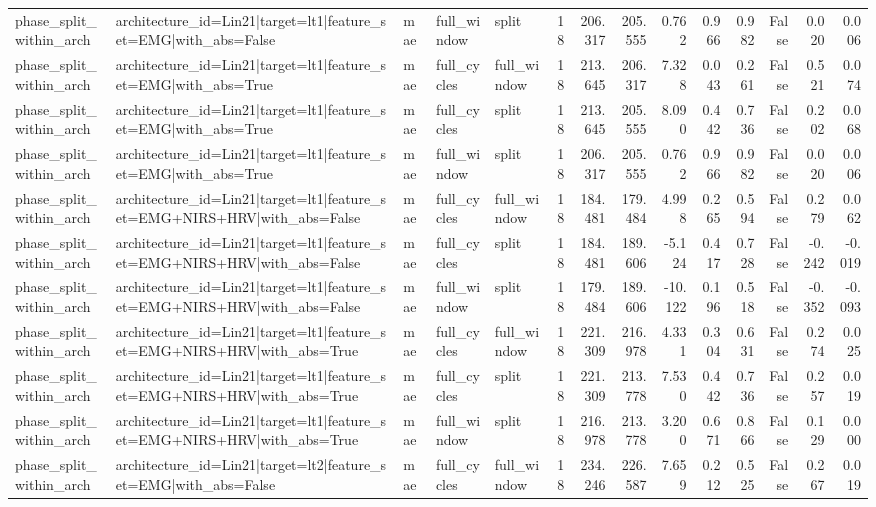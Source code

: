 \begin{table}
\begin{tabular}{lllllrrrrrrrrr}
phase_split_within_arch & architecture_id=Lin21|target=lt1|feature_set=EMG|with_abs=False & mae & full_window & split & 18 & 206.317 & 205.555 & 0.762 & 0.966 & 0.982 & False & 0.020 & 0.006 \\
phase_split_within_arch & architecture_id=Lin21|target=lt1|feature_set=EMG|with_abs=True & mae & full_cycles & full_window & 18 & 213.645 & 206.317 & 7.328 & 0.043 & 0.261 & False & 0.521 & 0.074 \\
phase_split_within_arch & architecture_id=Lin21|target=lt1|feature_set=EMG|with_abs=True & mae & full_cycles & split & 18 & 213.645 & 205.555 & 8.090 & 0.442 & 0.736 & False & 0.202 & 0.068 \\
phase_split_within_arch & architecture_id=Lin21|target=lt1|feature_set=EMG|with_abs=True & mae & full_window & split & 18 & 206.317 & 205.555 & 0.762 & 0.966 & 0.982 & False & 0.020 & 0.006 \\
phase_split_within_arch & architecture_id=Lin21|target=lt1|feature_set=EMG+NIRS+HRV|with_abs=False & mae & full_cycles & full_window & 18 & 184.481 & 179.484 & 4.998 & 0.265 & 0.594 & False & 0.279 & 0.062 \\
phase_split_within_arch & architecture_id=Lin21|target=lt1|feature_set=EMG+NIRS+HRV|with_abs=False & mae & full_cycles & split & 18 & 184.481 & 189.606 & -5.124 & 0.417 & 0.728 & False & -0.242 & -0.019 \\
phase_split_within_arch & architecture_id=Lin21|target=lt1|feature_set=EMG+NIRS+HRV|with_abs=False & mae & full_window & split & 18 & 179.484 & 189.606 & -10.122 & 0.196 & 0.518 & False & -0.352 & -0.093 \\
phase_split_within_arch & architecture_id=Lin21|target=lt1|feature_set=EMG+NIRS+HRV|with_abs=True & mae & full_cycles & full_window & 18 & 221.309 & 216.978 & 4.331 & 0.304 & 0.631 & False & 0.274 & 0.025 \\
phase_split_within_arch & architecture_id=Lin21|target=lt1|feature_set=EMG+NIRS+HRV|with_abs=True & mae & full_cycles & split & 18 & 221.309 & 213.778 & 7.530 & 0.442 & 0.736 & False & 0.257 & 0.019 \\
phase_split_within_arch & architecture_id=Lin21|target=lt1|feature_set=EMG+NIRS+HRV|with_abs=True & mae & full_window & split & 18 & 216.978 & 213.778 & 3.200 & 0.671 & 0.866 & False & 0.129 & 0.000 \\
phase_split_within_arch & architecture_id=Lin21|target=lt2|feature_set=EMG|with_abs=False & mae & full_cycles & full_window & 18 & 234.246 & 226.587 & 7.659 & 0.212 & 0.525 & False & 0.267 & 0.019 \\

\end{tabular}
\end{table}
